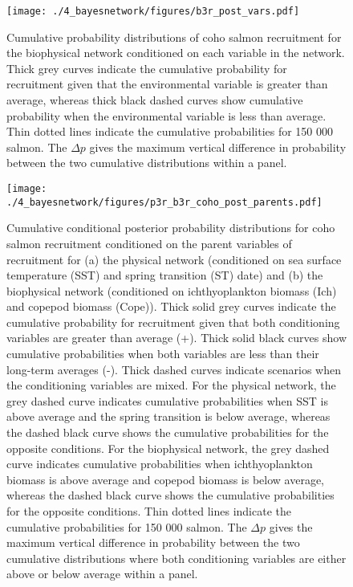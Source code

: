 \begin{figure}[htbp]
  \centering \texttt{[image: ./4\_bayesnetwork/figures/b3r\_post\_vars.pdf]}
  \caption{Cumulative probability distributions of coho salmon recruitment for
    the biophysical network conditioned on each variable in the network. Thick
    grey curves indicate the cumulative probability for recruitment given that
    the environmental variable is greater than average, whereas thick black
    dashed curves show cumulative probability when the environmental variable is
    less than average. Thin dotted lines indicate the cumulative probabilities
    for 150 000 salmon. The \(\Delta p\) gives the maximum vertical difference
    in probability between the two cumulative distributions within a panel.}
  \label{fig:bn:7}
\end{figure}

\begin{figure}[htbp]
  \centering \texttt{[image: ./4\_bayesnetwork/figures/p3r\_b3r\_coho\_post\_parents.pdf]}
  \caption{Cumulative conditional posterior probability distributions for coho
    salmon recruitment conditioned on the parent variables of recruitment for
    (a) the physical network (conditioned on sea surface temperature (SST) and
    spring transition (ST) date) and (b) the biophysical network (conditioned on
    ichthyoplankton biomass (Ich) and copepod biomass (Cope)). Thick solid grey
    curves indicate the cumulative probability for recruitment given that both
    conditioning variables are greater than average (+). Thick solid black
    curves show cumulative probabilities when both variables are less than their
    long-term averages (-). Thick dashed curves indicate scenarios when the
    conditioning variables are mixed. For the physical network, the grey dashed
    curve indicates cumulative probabilities when SST is above average and the
    spring transition is below average, whereas the dashed black curve shows the
    cumulative probabilities for the opposite conditions. For the biophysical
    network, the grey dashed curve indicates cumulative probabilities when
    ichthyoplankton biomass is above average and copepod biomass is below
    average, whereas the dashed black curve shows the cumulative probabilities
    for the opposite conditions. Thin dotted lines indicate the cumulative
    probabilities for 150 000 salmon.  The \(\Delta p\) gives the maximum
    vertical difference in probability between the two cumulative distributions
    where both conditioning variables are either above or below average within a
    panel.}
  \label{fig:bn:8}
\end{figure}

